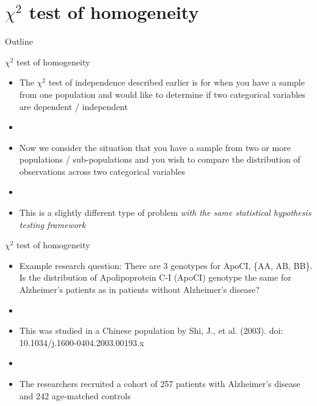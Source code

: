 \documentclass[xcolor=dvipsnames]{beamer}
\begin{document}
\section{$\chi^2$ test of homogeneity}
\begin{frame}{Outline}
\tableofcontents[currentsection,subsectionstyle=show/shaded/hide]
\end{frame}

\begin{frame}{$\chi^2$ test of homogeneity}
	\begin{itemize}
		\item The $\chi^2$ test of independence described earlier is for when you have a sample from one population and would like to determine if two categorical variables are dependent / independent
		\item[]
		\item Now we consider the situation that you have a sample from two or more populations / sub-populations and you wish to compare the distribution of observations across two categorical variables 
		\item[]
		\item This is a slightly different type of problem \emph{with the same statistical hypothesis testing framework}
	\end{itemize}
\end{frame}

\begin{frame}{$\chi^2$ test of homogeneity}
	\begin{itemize}
		\item Example research question: There are 3 genotypes for ApoCI, \{AA, AB, BB\}. Is the distribution of Apolipoprotein C-I (ApoCI) genotype the same for Alzheimer's patients as in patients without Alzheimer's disease? 
		\item[]
		\item This was studied in a Chinese population by Shi, J., et al. (2003). doi: 10.1034/j.1600-0404.2003.00193.x
		\item[]
		\item The researchers recruited a cohort of 257 patients with Alzheimer's disease and 242 age-matched controls
	\end{itemize}
\end{frame}
\end{document}
